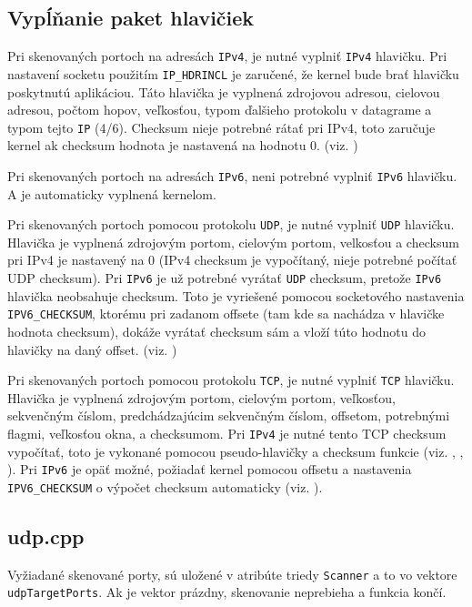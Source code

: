 \documentclass[titlepage]{article}
\begin{document}
\subsection{Vypĺňanie paket hlavičiek}
Pri skenovaných portoch na adresách \verb|IPv4|, je nutné vyplniť \verb|IPv4| hlavičku. Pri nastavení socketu použitím \verb|IP_HDRINCL| je zaručené, že kernel bude brať hlavičku poskytnutú aplikáciou. Táto hlavička je vyplnená zdrojovou adresou, cielovou adresou, počtom hopov, veľkosťou, typom ďalšieho protokolu v datagrame a typom tejto \verb|IP| (4/6). Checksum nieje potrebné rátať pri IPv4, toto zaručuje kernel ak checksum hodnota je nastavená na hodnotu 0. (viz. \cite{rfc791})\par 
Pri skenovaných portoch na adresách \verb|IPv6|, neni potrebné vyplniť \verb|IPv6| hlavičku. A je automaticky vyplnená kernelom. \par 
Pri skenovaných portoch pomocou protokolu \verb|UDP|, je nutné vyplniť \verb|UDP| hlavičku. Hlavička je vyplnená zdrojovým portom, cielovým portom, velkosťou a checksum pri IPv4 je nastavený na 0 (IPv4 checksum je vypočítaný, nieje potrebné počítať UDP checksum). Pri \verb|IPv6| je už potrebné vyrátať \verb|UDP| checksum, pretože \verb|IPv6| hlavička neobsahuje checksum. Toto je vyriešené pomocou socketového nastavenia \verb|IPV6_CHECKSUM|, ktorému pri zadanom offsete (tam kde sa nachádza v hlavičke hodnota checksum), dokáže vyrátať checksum sám a vloží túto hodnotu do hlavičky na daný offset. (viz. \cite{rfc768})\par 
Pri skenovaných portoch pomocou protokolu \verb|TCP|, je nutné vyplniť \verb|TCP| hlavičku. Hlavička je vyplnená zdrojovým portom, cielovým portom, veľkosťou, sekvenčným číslom, predchádzajúcim sekvenčným číslom, offsetom, potrebnými flagmi, veľkosťou okna, a checksumom. Pri \verb|IPv4| je nutné tento TCP checksum vypočítať, toto je vykonané pomocou pseudo-hlavičky a checksum funkcie (viz. \cite{rfc1071}, \cite{checksum}, \cite{veselyguide}). Pri \verb|IPv6| je opäť možné, požiadať kernel pomocou offsetu a nastavenia \verb|IPV6_CHECKSUM| o výpočet checksum automaticky (viz. \cite{rfc793}).

\subsection{udp.cpp}
Vyžiadané skenované porty, sú uložené v atribúte triedy \verb|Scanner| a to vo vektore \verb|udpTargetPorts|. Ak je vektor prázdny, skenovanie neprebieha a funkcia končí.\par
\end{document}
